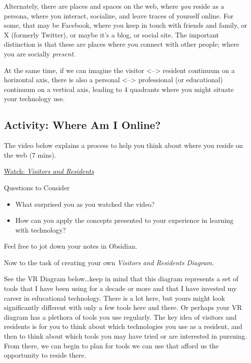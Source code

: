 \documentclass[
]{book}
\providecommand{\tightlist}{%
  \setlength{\itemsep}{0pt}\setlength{\parskip}{0pt}}
\theoremstyle{definition}
\theoremstyle{definition}
\theoremstyle{definition}
\theoremstyle{definition}
\theoremstyle{remark}
\begin{document}
Alternately, there are places and spaces on the web, where \emph{you} reside as a persona, where you interact, socialize, and leave traces of yourself online. For some, that may be Facebook, where you keep in touch with friends and family, or X (formerly Twitter), or maybe it's a blog, or social site. The important distinction is that these are places where you connect with other people; where you are socially \emph{present}.

At the same time, if we can imagine the visitor \textless--\textgreater{} resident continuum on a horizontal axis, there is also a personal \textless--\textgreater{} professional (or educational) continuum on a vertical axis, leading to 4 quadrants where you might situate your technology use.

\hypertarget{activity-where-am-i-online}{%
\subsection*{Activity: Where Am I Online?}\label{activity-where-am-i-online}}

\begin{reflect}
The video below explains a process to help you think about where you reside on the web (7 mins).

\href{https://www.youtube.com/watch?v=sPOG3iThmRI}{Watch: \emph{Visitors and Residents}}

{Questions to Consider}

\begin{itemize}
\tightlist
\item
  What surprised you as you watched the video?
\item
  How can you apply the concepts presented to your experience in learning with technology?
\end{itemize}

Feel free to jot down your notes in Obsidian.
\end{reflect}

Now to the task of creating your own \emph{Visitors and Residents Diagram}.

See the VR Diagram below\ldots keep in mind that this diagram represents a set of tools that I have been using for a decade or more and that I have invested my career in educational technology. There is a lot here, but yours might look significantly different with only a few tools here and there. Or perhaps your VR diagram has a plethora of tools you use regularly. The key idea of visitors and residents is for you to think about which technologies you use as a resident, and then to think about which tools you may have tried or are interested in pursuing. From there, we can begin to plan for tools we can use that afford us the opportunity to reside there.
\end{document}
